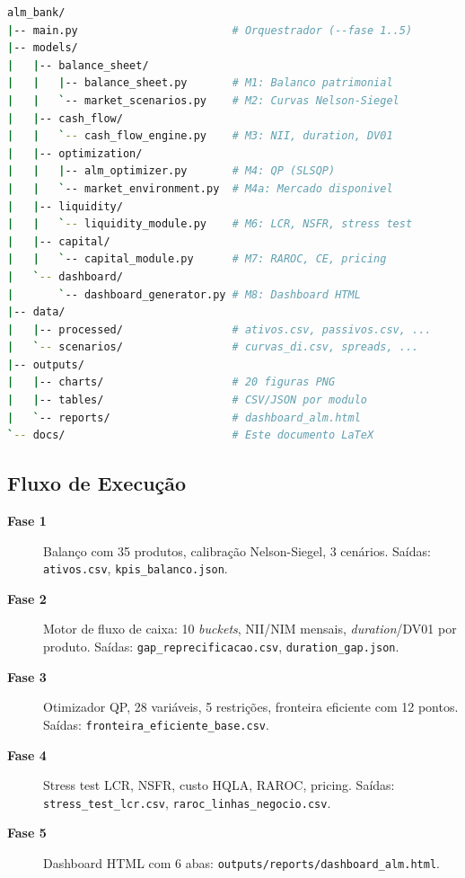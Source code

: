 \documentclass[12pt, a4paper, oneside]{article}
\begin{document}
\begin{lstlisting}[language=bash,
                   caption={Estrutura de diretórios do projeto ALM Bank},
                   label={lst:estrutura}]
alm_bank/
|-- main.py                        # Orquestrador (--fase 1..5)
|-- models/
|   |-- balance_sheet/
|   |   |-- balance_sheet.py       # M1: Balanco patrimonial
|   |   `-- market_scenarios.py    # M2: Curvas Nelson-Siegel
|   |-- cash_flow/
|   |   `-- cash_flow_engine.py    # M3: NII, duration, DV01
|   |-- optimization/
|   |   |-- alm_optimizer.py       # M4: QP (SLSQP)
|   |   `-- market_environment.py  # M4a: Mercado disponivel
|   |-- liquidity/
|   |   `-- liquidity_module.py    # M6: LCR, NSFR, stress test
|   |-- capital/
|   |   `-- capital_module.py      # M7: RAROC, CE, pricing
|   `-- dashboard/
|       `-- dashboard_generator.py # M8: Dashboard HTML
|-- data/
|   |-- processed/                 # ativos.csv, passivos.csv, ...
|   `-- scenarios/                 # curvas_di.csv, spreads, ...
|-- outputs/
|   |-- charts/                    # 20 figuras PNG
|   |-- tables/                    # CSV/JSON por modulo
|   `-- reports/                   # dashboard_alm.html
`-- docs/                          # Este documento LaTeX
\end{lstlisting}

\subsection{Fluxo de Execução}

\begin{description}
  \item[\textbf{Fase 1}] Balanço com 35 produtos, calibração Nelson-Siegel,
    3 cenários. Saídas: \texttt{ativos.csv}, \texttt{kpis\_balanco.json}.
  \item[\textbf{Fase 2}] Motor de fluxo de caixa: 10 \textit{buckets},
    NII/NIM mensais, \textit{duration}/DV01 por produto.
    Saídas: \texttt{gap\_reprecificacao.csv}, \texttt{duration\_gap.json}.
  \item[\textbf{Fase 3}] Otimizador QP, 28 variáveis, 5 restrições,
    fronteira eficiente com 12 pontos.
    Saídas: \texttt{fronteira\_eficiente\_base.csv}.
  \item[\textbf{Fase 4}] Stress test LCR, NSFR, custo HQLA, RAROC, pricing.
    Saídas: \texttt{stress\_test\_lcr.csv}, \texttt{raroc\_linhas\_negocio.csv}.
  \item[\textbf{Fase 5}] Dashboard HTML com 6 abas:
    \texttt{outputs/reports/dashboard\_alm.html}.
\end{description}
\end{document}
